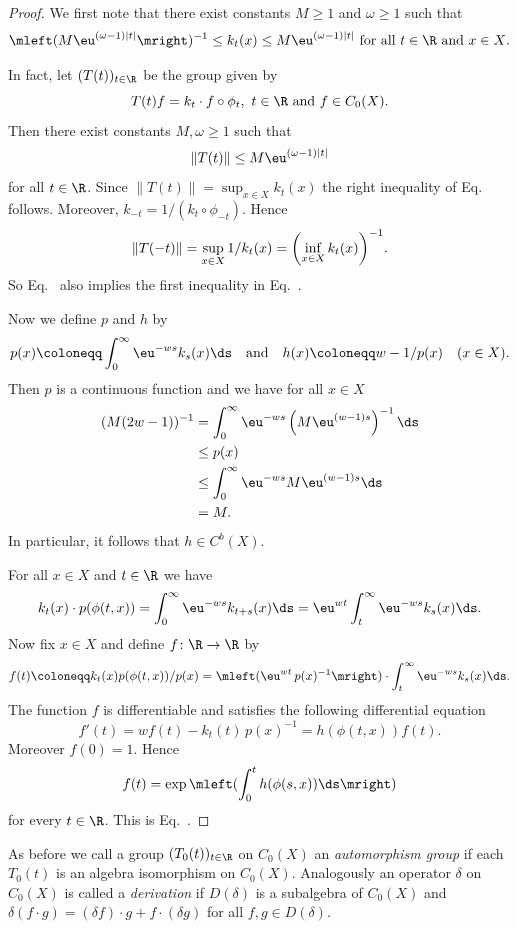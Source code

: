 \begin{proof}
We first note that there exist constants $M \geq 1 $ and $\omega \geq 1$ such that
\begin{equation}\label{eq:b2-3.16}
\mleft( M\eu^{(\omega-1)|t|} \mright)^{-1} \leq k_{t}(x) 
	\leq M\eu^{(\omega-1)|t|} \text{ for all $t \in \R$ and  $x \in X$.}
\end{equation}

In fact, let $(T(t))_{t \in \R}$ be the group given by 
%
\[
	T(t)f = k_{t} \cdot f \circ \phi_{t}, 
	\text{ $ t \in \R$ and $f \in C_{0}(X)$}.
\]
%
Then there exist constants $M, \omega \geq 1$ such that
\begin{equation}\label{eq:b2-3.17}
\|T(t)\| \leq M\eu^{(\omega-1)|t|}
\end{equation}
for all $t \in \R$.
Since $\|T(t)\| = \sup_{x \in X} k_{t}(x)$ the right inequality of
Eq.~ follows.
Moreover, $k_{-t} = 1/(k_{t} \circ \phi_{-t})$.
Hence 
%
\[
	\|T(-t)\| = \sup_{x \in X} 1/k_{t}(x) = \mleft( \inf_{x \in X} k_{t}(x) \mright)^{-1} .
\]
%
So Eq.~ also implies the first inequality in Eq.~.

Now we define $p$ and $h$ by
\[
p(x) \coloneqq \int_{0}^{\infty} \eu^{-ws}k_{s}(x) \ds 
\quad \text{and} \quad 
h(x) \coloneqq w - 1/p(x) \quad (x \in X).
\]
Then $p$ is a continuous function and we have for all $x \in X $
\begin{align*}
(M(2w - 1))^{-1} &= \int_{0}^{\infty} \eu^{-ws}\left(M\eu^{(w-1)s}\right)^{-1} \ds \\ 
&\leq p(x) \\ 
&\leq \int_{0}^{\infty} \eu^{-ws}M\eu^{(w-1)s} \ds \\
&= M .
\end{align*}
In particular, it follows that $h \in C^{b}(X)$.

For all $x \in X$ and $t \in \R$ we have 
\[
k_{t}(x) \cdot p(\phi(t,x)) = \int_{0}^{\infty} \eu^{-ws}k_{t+s}(x) \ds 
= \eu^{wt} \int_{t}^{\infty} \eu^{-ws}k_{s}(x) \ds.
\]
Now fix $x \in X$ and define $f \colon \R \to \R$ by 
\[
f(t) \coloneqq k_{t}(x)p(\phi(t,x))/p(x) 
 = \mleft( \eu^{wt}\,p(x)^{-1} \mright) \cdot \int_{t}^{\infty} \eu^{-ws}k_{s}(x)  \ds.
\]
The function $f$ is differentiable and satisfies the following differential equation 
\[
f'(t) = wf(t)  - k_{t}(t)\,p(x)^{-1}  = h(\phi(t,x))f(t).
\]
Moreover $f(0) = 1$.
Hence %
\[
	f(t) = \exp \mleft( \int_{0}^{t} h(\phi(s,x)) \ds \mright)
\]
%
for every $t \in \R$.
This is Eq.~.
\end{proof}
As before we call a group $(T_{0}(t))_{t \in \R}$ on $C_{0}(X)$ an \emph{automorphism group} if each $T_{0}(t)$ is an algebra isomorphism on $C_{0}(X)$.
Analogously an operator $\delta$ on $C_{0}(X)$ is called a \emph{derivation} if\/ $D(\delta)$ is a subalgebra of\/ $C_{0}(X)$ and $\delta(f \cdot g) = (\delta f) \cdot g + f \cdot (\delta g)$ for all $f,g \in D(\delta)$.

